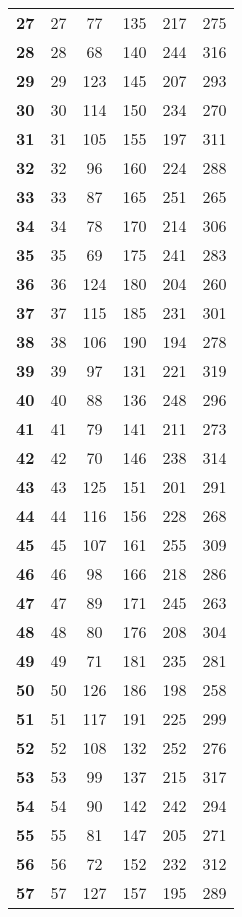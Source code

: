\begin{longtable}{|r|c|c|c|c|c|}
    \textbf{27} & 27 &77 & 135 & 217 & 275 \\
    \textbf{28} & 28 &68 & 140 & 244 & 316 \\
    \textbf{29} & 29 &123 & 145 & 207 & 293 \\
    \textbf{30} & 30 &114 & 150 & 234 & 270 \\
    \textbf{31} & 31 &105 & 155 & 197 & 311 \\
    \textbf{32} & 32 &96 & 160 & 224 & 288 \\
    \textbf{33} & 33 &87 & 165 & 251 & 265 \\
    \textbf{34} & 34 &78 & 170 & 214 & 306 \\
    \textbf{35} & 35 &69 & 175 & 241 & 283 \\
    \textbf{36} & 36 &124 & 180 & 204 & 260 \\
    \textbf{37} & 37 &115 & 185 & 231 & 301 \\
    \textbf{38} & 38 &106 & 190 & 194 & 278 \\
    \textbf{39} & 39 &97 & 131 & 221 & 319 \\
    \textbf{40} & 40 &88 & 136 & 248 & 296 \\
    \textbf{41} & 41 &79 & 141 & 211 & 273 \\
    \textbf{42} & 42 &70 & 146 & 238 & 314 \\
    \textbf{43} & 43 &125 & 151 & 201 & 291 \\
    \textbf{44} & 44 &116 & 156 & 228 & 268 \\
    \textbf{45} & 45 &107 & 161 & 255 & 309 \\
    \textbf{46} & 46 &98 & 166 & 218 & 286 \\
    \textbf{47} & 47 &89 & 171 & 245 & 263 \\
    \textbf{48} & 48 &80 & 176 & 208 & 304 \\
    \textbf{49} & 49 &71 & 181 & 235 & 281 \\
    \textbf{50} & 50 &126 & 186 & 198 & 258 \\
    \textbf{51} & 51 &117 & 191 & 225 & 299 \\
    \textbf{52} & 52 &108 & 132 & 252 & 276 \\
    \textbf{53} & 53 &99 & 137 & 215 & 317 \\
    \textbf{54} & 54 &90 & 142 & 242 & 294 \\
    \textbf{55} & 55 &81 & 147 & 205 & 271 \\
    \textbf{56} & 56 &72 & 152 & 232 & 312 \\
    \textbf{57} & 57 &127 & 157 & 195 & 289 \\

\end{longtable}
